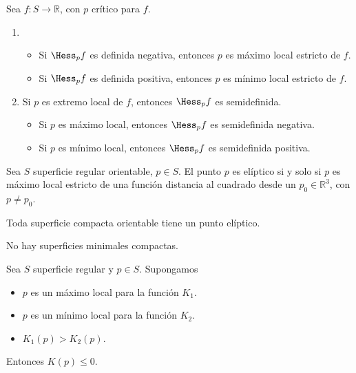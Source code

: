 \begin{proposition}
    Sea $f : S \to \mathbb{R}$, con $p$ crítico para $f$.
    \begin{enumerate}
        \item \begin{itemize}
                  \item Si $\Hess_pf$ es definida negativa, entonces $p$ es máximo local estricto de $f$.
                  \item Si $\Hess_pf$ es definida positiva, entonces $p$ es mínimo local estricto de $f$.
              \end{itemize}
        \item Si $p$ es extremo local de $f$, entonces $\Hess_pf$ es semidefinida.
              \begin{itemize}
                  \item Si $p$ es máximo local, entonces $\Hess_pf$ es semidefinida negativa.
                  \item Si $p$ es mínimo local, entonces $\Hess_pf$ es semidefinida positiva.
              \end{itemize}
    \end{enumerate}
\end{proposition}

\begin{proposition}
    Sea $S$ superficie regular orientable, $p \in S$.
    El punto $p$ es elíptico si y solo si $p$ es máximo local estricto de una función distancia al cuadrado desde un $p_0 \in \mathbb{R}^3$, con $p \neq p_0$.
\end{proposition}

\begin{corollary}
    Toda superficie compacta orientable tiene un punto elíptico.
\end{corollary}

\begin{corollary}
    No hay superficies minimales compactas.
\end{corollary}

\begin{lemma}
    Sea $S$ superficie regular y $p \in S$. Supongamos
    \begin{itemize}
        \item $p$ es un máximo local para la función $K_1$.
        \item $p$ es un mínimo local para la función $K_2$.
        \item $K_1(p) > K_2(p)$.
    \end{itemize}
    Entonces $K(p) \leq 0$.
\end{lemma}

